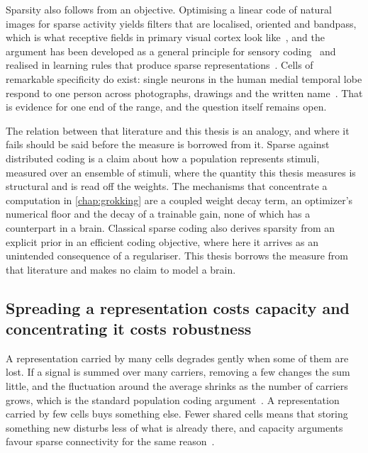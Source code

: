 Sparsity also follows from an objective. Optimising a linear code of
natural images for sparse activity yields filters that are localised, oriented
and bandpass, which is what receptive fields in primary visual cortex look
like~\cite{olshausen_emergence_1996}, and the argument has been developed as a
general principle for sensory coding~\cite{olshausen_sparse_2004} and realised
in learning rules that produce sparse
representations~\cite{foldiak_sparse_1995}. Cells of remarkable specificity do
exist: single neurons in the human medial temporal lobe respond to one person
across photographs, drawings and the written
name~\cite{quianquiroga_invariant_2005}. That is evidence for one end of the
range, and the question itself remains open.

The relation between that literature and this thesis is an analogy, and where it fails should
be said before the measure is borrowed from it. Sparse
against distributed coding is a claim about how a population represents
stimuli, measured over an ensemble of stimuli, where the quantity this thesis
measures is structural and is read off the weights. The mechanisms that
concentrate a computation in \cref{chap:grokking} are a coupled weight decay
term, an optimizer's numerical floor and the decay of a trainable gain, none
of which has a counterpart in a brain. Classical sparse coding also derives
sparsity from an explicit prior in an efficient coding objective, where here
it arrives as an unintended consequence of a regulariser. This thesis borrows
the measure from that literature and makes no claim to model a brain.

\subsection{Spreading a representation costs capacity and concentrating it costs robustness}
\label{sec:bg_codingprice}

A representation carried by many cells degrades gently when some of them are
lost. If a signal is summed over many carriers, removing a few changes the sum
little, and the fluctuation around the average shrinks as the number of
carriers grows, which is the standard population coding
argument~\cite{averbeck_neural_2006}. A representation carried by few cells
buys something else. Fewer shared cells means that storing something new
disturbs less of what is already there, and capacity arguments favour sparse
connectivity for the same
reason~\cite{rolls_relative_1990, litwinkumar_optimal_2017}.

